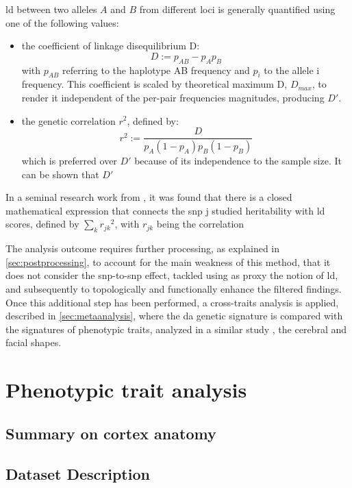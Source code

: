 \Ac{ld} between two alleles $A$ and $B$ from different loci is generally quantified using one of the following values: 
\begin{itemize}
\item{
the coefficient of linkage disequilibrium D:
$$
D := p_{AB} - p_Ap_B
$$
with $p_{AB}$ referring to the haplotype AB frequency and $p_i$ to the allele i frequency. This coefficient is scaled by theoretical maximum D, $D_{max}$, to render it independent of the per-pair frequencies magnitudes, producing $D'$.
}
\item{
the genetic correlation $r^2$, defined by:
$$
r^2:= \frac{D}{p_A(1-p_A)p_B(1-p_B)}
$$
which is preferred over $D'$ because of its independence to the sample size. It can be shown that $D'$
}
\end{itemize}

 In a seminal research work from \citet{Bulik-Sullivan2015}, it was found that there is a closed mathematical expression that connects the \ac{snp} j studied heritability with \ac{ld} scores, defined by $\sum_k{{r_{jk}}^2}$, with $r_{jk}$ being the correlation 

The analysis outcome requires further processing, as explained in \autoref{sec:postprocessing}, to account for the main weakness of this method, that it does not consider the \ac{snp}-to-\ac{snp} effect, tackled using as proxy the notion of \ac{ld}, and subsequently to topologically and functionally enhance the filtered findings. Once this additional step has been performed, a cross-traits analysis is applied, described in \autoref{sec:metaanalysis}, where the \ac{da} genetic signature is compared with the signatures of phenotypic traits, analyzed in a similar study \cite{Naqvi2021}, the cerebral and facial shapes.





\section{Phenotypic trait analysis}\label{sec:phenotype_intro}
\subsection{Summary on cortex anatomy}
 
\subsection{Dataset Description}
 

